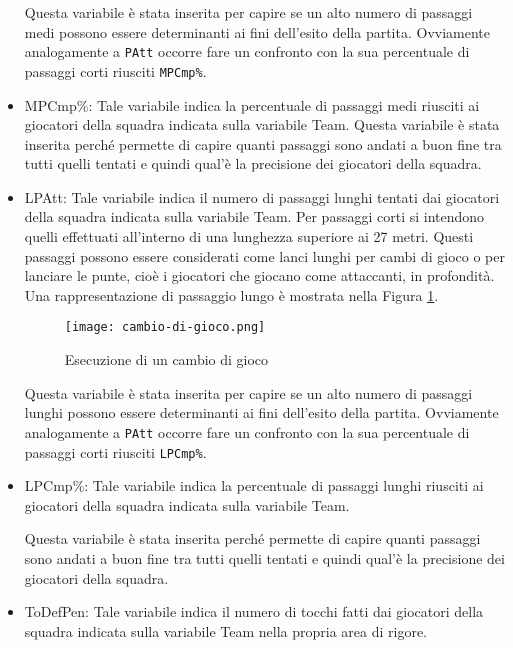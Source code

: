 \begin{itemize}
	Questa variabile è stata inserita per capire se un alto numero di passaggi medi possono essere determinanti ai fini dell'esito della partita. Ovviamente analogamente a \texttt{PAtt} occorre fare un confronto con la sua percentuale di passaggi corti riusciti \texttt{MPCmp\%}.

	\item \textsf{MPCmp\%}: Tale variabile indica la percentuale di passaggi medi riusciti ai giocatori della squadra indicata sulla variabile \textsf{Team}. Questa variabile è stata inserita perché permette di capire quanti passaggi sono andati a buon fine tra tutti quelli tentati e quindi qual'è la precisione dei giocatori della squadra.
	\item \textsf{LPAtt}: Tale variabile indica il numero di passaggi lunghi tentati dai giocatori della squadra indicata sulla variabile \textsf{Team}. Per passaggi corti si intendono quelli effettuati all'interno di una lunghezza superiore ai 27 metri. Questi passaggi possono essere considerati come lanci lunghi per cambi di gioco o per lanciare le punte, cioè i giocatori che giocano come attaccanti, in profondità. Una rappresentazione di passaggio lungo è mostrata nella Figura \ref{fig:cambio}.
	\begin{figure}[ht]
		\begin{center}
			\texttt{[image: cambio-di-gioco.png]}
			\caption{Esecuzione di un cambio di gioco} \label{fig:cambio}
		\end{center}
	\end{figure}
	
	Questa variabile è stata inserita per capire se un alto numero di passaggi lunghi possono essere determinanti ai fini dell'esito della partita. Ovviamente analogamente a \texttt{PAtt} occorre fare un confronto con la sua percentuale di passaggi corti riusciti \texttt{LPCmp\%}.

	\item \textsf{LPCmp\%}: Tale variabile indica la percentuale di passaggi lunghi riusciti ai giocatori della squadra indicata sulla variabile \textsf{Team}. 
	
	Questa variabile è stata inserita perché permette di capire quanti passaggi sono andati a buon fine tra tutti quelli tentati e quindi qual'è la precisione dei giocatori della squadra.
	\item \textsf{ToDefPen}: Tale variabile indica il numero di tocchi fatti dai giocatori della squadra indicata sulla variabile \textsf{Team} nella propria area di rigore. 
	

\end{itemize}
